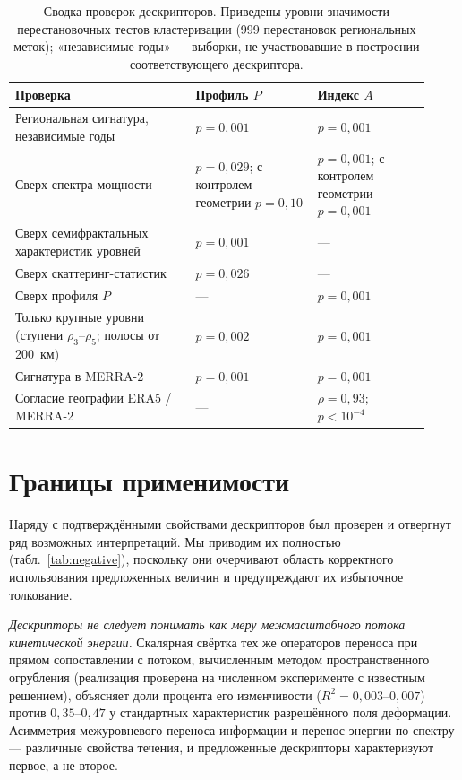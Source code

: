 \documentclass[11pt,a4paper]{article}
\begin{document}
\begin{table}[t]
\centering
\caption{Сводка проверок дескрипторов. Приведены уровни значимости перестановочных тестов кластеризации (999 перестановок региональных меток); «независимые годы» --- выборки, не участвовавшие в построении соответствующего дескриптора.}
\label{tab:tests}
\small
\begin{tabular}{@{}p{0.40\linewidth}p{0.27\linewidth}p{0.25\linewidth}@{}}
\toprule
Проверка & Профиль $P$ & Индекс $A$\\
\midrule
Региональная сигнатура, независимые годы & $p=0{,}001$ & $p=0{,}001$\\
Сверх спектра мощности & $p=0{,}029$; с контролем геометрии $p=0{,}10$ & $p=0{,}001$; с контролем геометрии $p=0{,}001$\\
Сверх семифрактальных характеристик уровней \cite{Krenke2019} & $p=0{,}001$ & ---\\
Сверх скаттеринг-статистик \cite{Cheng2024} & $p=0{,}026$ & ---\\
Сверх профиля $P$ & --- & $p=0{,}001$\\
Только крупные уровни (ступени $\rho_3$--$\rho_5$; полосы от 200~км) & $p=0{,}002$ & $p=0{,}001$\\
Сигнатура в MERRA-2 & $p=0{,}001$ & $p=0{,}001$\\
Согласие географии ERA5 / MERRA-2 & --- & $\rho=0{,}93$; $p<10^{-4}$\\
\bottomrule
\end{tabular}
\end{table}

\section{Границы применимости}
\label{sec:limits}

Наряду с подтверждёнными свойствами дескрипторов был проверен и отвергнут ряд возможных интерпретаций. Мы приводим их полностью (табл.~\ref{tab:negative}), поскольку они очерчивают область корректного использования предложенных величин и предупреждают их избыточное толкование.

\emph{Дескрипторы не следует понимать как меру межмасштабного потока кинетической энергии.} Скалярная свёртка тех же операторов переноса при прямом сопоставлении с потоком, вычисленным методом пространственного огрубления \cite{Germano1992,Aluie2018} (реализация проверена на численном эксперименте с известным решением), объясняет доли процента его изменчивости ($R^2=0{,}003$--$0{,}007$) против $0{,}35$--$0{,}47$ у стандартных характеристик разрешённого поля деформации. Асимметрия межуровневого переноса информации и перенос энергии по спектру --- различные свойства течения, и предложенные дескрипторы характеризуют первое, а не второе.
\end{document}
